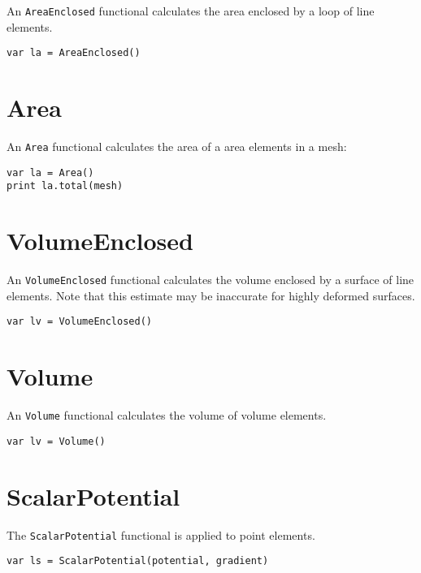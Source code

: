 An \texttt{AreaEnclosed} functional calculates the area enclosed by a
loop of line elements.

\begin{lstlisting}
var la = AreaEnclosed()
\end{lstlisting}

\hypertarget{area}{%
\section{Area}\label{area}}

An \texttt{Area} functional calculates the area of a area elements in a
mesh:

\begin{lstlisting}
var la = Area()
print la.total(mesh)
\end{lstlisting}

\hypertarget{volumeenclosed}{%
\section{VolumeEnclosed}\label{volumeenclosed}}

An \texttt{VolumeEnclosed} functional calculates the volume enclosed by
a surface of line elements. Note that this estimate may be inaccurate
for highly deformed surfaces.

\begin{lstlisting}
var lv = VolumeEnclosed()
\end{lstlisting}

\hypertarget{volume}{%
\section{Volume}\label{volume}}

An \texttt{Volume} functional calculates the volume of volume elements.

\begin{lstlisting}
var lv = Volume()
\end{lstlisting}

\hypertarget{scalarpotential}{%
\section{ScalarPotential}\label{scalarpotential}}

The \texttt{ScalarPotential} functional is applied to point elements.

\begin{lstlisting}
var ls = ScalarPotential(potential, gradient)
\end{lstlisting}

